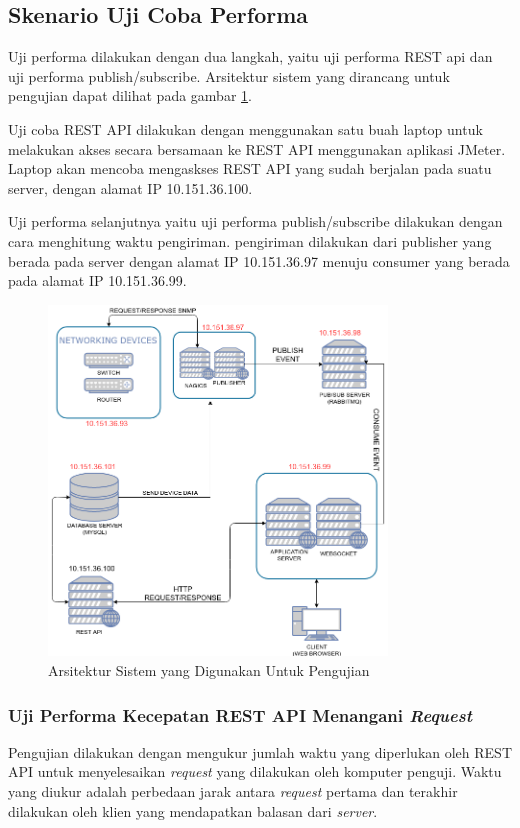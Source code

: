         
    \subsection{Skenario Uji Coba Performa}
    	Uji performa dilakukan dengan dua langkah, yaitu uji performa REST api dan uji performa publish/subscribe. Arsitektur sistem yang dirancang untuk pengujian dapat dilihat pada gambar \ref{arsitekturpengujian}.
    	
    	Uji coba REST API dilakukan dengan menggunakan satu buah laptop untuk melakukan akses secara bersamaan ke REST API menggunakan aplikasi JMeter. Laptop akan mencoba mengaskses REST API yang sudah berjalan pada suatu server, dengan alamat IP 10.151.36.100.
    	
    	Uji performa selanjutnya yaitu uji performa publish/subscribe dilakukan dengan cara menghitung waktu pengiriman. pengiriman dilakukan dari publisher yang berada pada server dengan alamat IP 10.151.36.97 menuju consumer yang berada pada alamat IP 10.151.36.99.
    	
    	\begin{figure}[H]
    		\centering
    		\includegraphics[width=9cm]{Images/C-5/arsitesting.png}
    		\caption{Arsitektur Sistem yang Digunakan Untuk Pengujian}
    		\label{arsitekturpengujian}
    	\end{figure}
        
    	\subsubsection{Uji Performa Kecepatan REST API Menangani \textit{Request}}
        	Pengujian dilakukan dengan mengukur jumlah waktu yang diperlukan oleh REST API untuk menyelesaikan \textit{request} yang dilakukan oleh komputer penguji. Waktu yang diukur adalah perbedaan jarak antara \textit{request} pertama dan terakhir dilakukan oleh klien yang mendapatkan balasan dari \textit{server}.
        	
